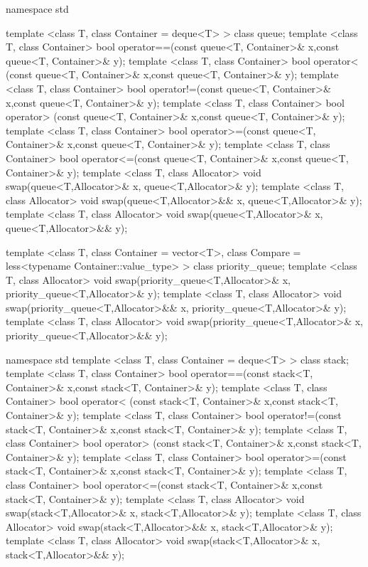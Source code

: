 \documentclass[american,twoside]{book}
\begin{document}
\begin{codeblock}
namespace std {
  template <class T, class Container = deque<T> > class queue;
  template <class T, class Container>
    bool operator==(const queue<T, Container>& x,const queue<T, Container>& y);
  template <class T, class Container>
    bool operator< (const queue<T, Container>& x,const queue<T, Container>& y);
  template <class T, class Container>
    bool operator!=(const queue<T, Container>& x,const queue<T, Container>& y);
  template <class T, class Container>
    bool operator> (const queue<T, Container>& x,const queue<T, Container>& y);
  template <class T, class Container>
    bool operator>=(const queue<T, Container>& x,const queue<T, Container>& y);
  template <class T, class Container>
    bool operator<=(const queue<T, Container>& x,const queue<T, Container>& y);
  template <class T, class Allocator>
    void swap(queue<T,Allocator>& x, queue<T,Allocator>& y);
  template <class T, class Allocator>
    void swap(queue<T,Allocator>&& x, queue<T,Allocator>& y);
  template <class T, class Allocator>
    void swap(queue<T,Allocator>& x, queue<T,Allocator>&& y);

  template <class T, class Container = vector<T>,
        class Compare = less<typename Container::value_type> >
  class priority_queue;
  template <class T, class Allocator>
    void swap(priority_queue<T,Allocator>& x, priority_queue<T,Allocator>& y);
  template <class T, class Allocator>
    void swap(priority_queue<T,Allocator>&& x, priority_queue<T,Allocator>& y);
  template <class T, class Allocator>
    void swap(priority_queue<T,Allocator>& x, priority_queue<T,Allocator>&& y);
}
\end{codeblock}

%

\begin{codeblock}
namespace std {
  template <class T, class Container = deque<T> > class stack;
  template <class T, class Container>
    bool operator==(const stack<T, Container>& x,const stack<T, Container>& y);
  template <class T, class Container>
    bool operator< (const stack<T, Container>& x,const stack<T, Container>& y);
  template <class T, class Container>
    bool operator!=(const stack<T, Container>& x,const stack<T, Container>& y);
  template <class T, class Container>
    bool operator> (const stack<T, Container>& x,const stack<T, Container>& y);
  template <class T, class Container>
    bool operator>=(const stack<T, Container>& x,const stack<T, Container>& y);
  template <class T, class Container>
    bool operator<=(const stack<T, Container>& x,const stack<T, Container>& y);
  template <class T, class Allocator>
    void swap(stack<T,Allocator>& x, stack<T,Allocator>& y);
  template <class T, class Allocator>
    void swap(stack<T,Allocator>&& x, stack<T,Allocator>& y);
  template <class T, class Allocator>
    void swap(stack<T,Allocator>& x, stack<T,Allocator>&& y);
}
\end{codeblock}
\end{document}
